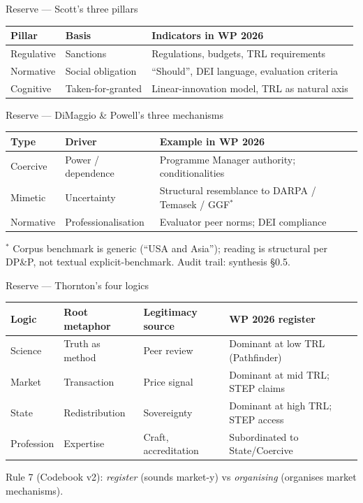 \documentclass[aspectratio=169,hyperref={pdfpagelabels=false}]{beamer}
\begin{document}
\begin{frame}{Reserve — Scott's three pillars}
    \begin{center}
    \begin{tabular}{@{}lll@{}}
        \toprule
        Pillar & Basis & Indicators in WP 2026 \\ \midrule
        Regulative & Sanctions & Regulations, budgets, TRL requirements \\
        Normative  & Social obligation & \enquote{Should}, DEI language, evaluation criteria \\
        Cognitive  & Taken-for-granted & Linear-innovation model, TRL as natural axis \\ \bottomrule
    \end{tabular}
    \end{center}
\end{frame}

\begin{frame}{Reserve — DiMaggio \& Powell's three mechanisms}
    \begin{center}
    \begin{tabular}{@{}lll@{}}
        \toprule
        Type & Driver & Example in WP 2026 \\ \midrule
        Coercive & Power / dependence & Programme Manager authority; conditionalities \\
        Mimetic  & Uncertainty & Structural resemblance to DARPA / Temasek / GGF$^*$ \\
        Normative & Professionalisation & Evaluator peer norms; DEI compliance \\ \bottomrule
    \end{tabular}
    \end{center}
    \vspace{2mm}
    \footnotesize $^*$ Corpus benchmark is generic (\enquote{USA and Asia}); reading is structural per DP\&P, not textual explicit-benchmark. Audit trail: synthesis §0.5.
\end{frame}

\begin{frame}{Reserve — Thornton's four logics}
    \begin{center}
    \begin{tabular}{@{}llll@{}}
        \toprule
        Logic & Root metaphor & Legitimacy source & WP 2026 register \\ \midrule
        Science    & Truth as method & Peer review & Dominant at low TRL (Pathfinder) \\
        Market     & Transaction     & Price signal & Dominant at mid TRL; STEP claims \\
        State      & Redistribution  & Sovereignty & Dominant at high TRL; STEP access \\
        Profession & Expertise       & Craft, accreditation & Subordinated to State/Coercive \\ \bottomrule
    \end{tabular}
    \end{center}
    \vspace{2mm}
    \footnotesize Rule 7 (Codebook v2): \emph{register} (sounds market-y) vs \emph{organising} (organises market mechanisms).
\end{frame}
\end{document}
